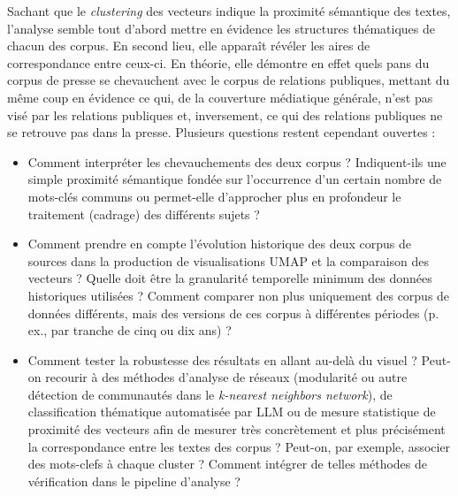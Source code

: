 \documentclass[final, fra]{anthology-ch}     %
\begin{document}
Sachant que le \textit{clustering} des vecteurs indique la proximité sémantique des textes, l’analyse semble tout d'abord mettre en évidence les structures thématiques de chacun des corpus. En second lieu, elle apparaît révéler les aires de correspondance entre ceux-ci. En théorie, elle démontre en effet quels pans du corpus de presse se chevauchent avec le corpus de relations publiques, mettant du même coup en évidence ce qui, de la couverture médiatique générale, n’est pas visé par les relations publiques et, inversement, ce qui des relations publiques ne se retrouve pas dans la presse. Plusieurs questions restent cependant ouvertes :
\begin{itemize}
    \item Comment interpréter les chevauchements des deux corpus ? Indiquent-ils une simple proximité sémantique fondée sur l'occurrence d’un certain nombre de mots-clés communs ou permet-elle d’approcher plus en profondeur le traitement (cadrage) des différents sujets ?
    \item Comment prendre en compte l’évolution historique des deux corpus de sources dans la production de visualisations UMAP et la comparaison des vecteurs ? Quelle doit être la granularité temporelle minimum des données historiques utilisées ? Comment comparer non plus uniquement des corpus de données différents, mais des versions de ces corpus à différentes périodes (p. ex., par tranche de cinq ou dix ans) ?
    \item Comment tester la robustesse des résultats en allant au-delà du visuel ? Peut-on recourir à des méthodes d’analyse de réseaux (modularité ou autre détection de communautés dans le \textit{k-nearest neighbors network}), de classification thématique automatisée par LLM ou de mesure statistique de proximité des vecteurs afin de mesurer très concrètement et plus précisément la correspondance entre les textes des corpus ? Peut-on, par exemple, associer des mots-clefs à chaque cluster ? Comment intégrer de telles méthodes de vérification dans le pipeline d’analyse ?
\end{itemize}
\end{document}
